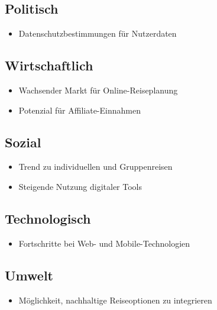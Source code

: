 \documentclass{article}
\begin{document}
\subsection{Politisch}\label{politisch}

\begin{itemize}
\tightlist
\item
  Datenschutzbestimmungen für Nutzerdaten
\end{itemize}

\subsection{Wirtschaftlich}\label{wirtschaftlich}

\begin{itemize}
\tightlist
\item
  Wachsender Markt für Online-Reiseplanung
\item
  Potenzial für Affiliate-Einnahmen
\end{itemize}

\subsection{Sozial}\label{sozial}

\begin{itemize}
\tightlist
\item
  Trend zu individuellen und Gruppenreisen
\item
  Steigende Nutzung digitaler Tools
\end{itemize}

\subsection{Technologisch}\label{technologisch}

\begin{itemize}
\tightlist
\item
  Fortschritte bei Web- und Mobile-Technologien
\end{itemize}

\subsection{Umwelt}\label{umwelt}

\begin{itemize}
\tightlist
\item
  Möglichkeit, nachhaltige Reiseoptionen zu integrieren
\end{itemize}
\end{document}
